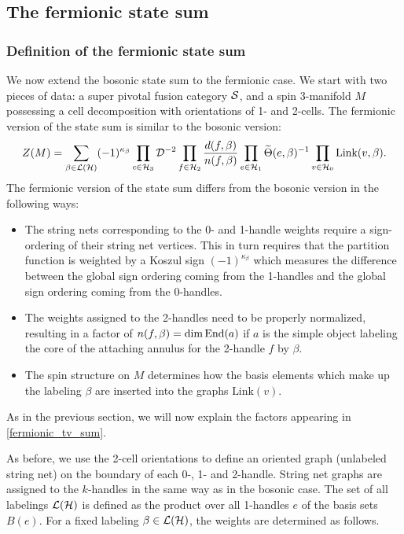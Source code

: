 \subsection{The fermionic state sum}


\subsubsection{Definition of the fermionic state sum}

We now extend the bosonic state sum to the fermionic case. 
We start with two pieces of data: a super pivotal fusion category $\mathcal{S}$, and a spin
3-manifold $M$ possessing a cell decomposition with orientations of 1- and 2-cells.
The fermionic version of the state sum is similar to the bosonic version:
\begin{align}
\label{fermionic_tv_sum}
	Z(M) = \sum_{\beta\in\mathcal{L}(\mathcal{H})}(-1)^{\kappa_\beta}
		\prod_{c\in\mathcal{H}_3} \mathcal{D}^{-2}
		\prod_{f\in\mathcal{H}_2} \frac{d(f, \beta)}{n(f,\beta)}
		\prod_{e\in\mathcal{H}_1}  \widetilde \Theta(e, \beta)^{-1}
		\prod_{v\in\mathcal{H}_0} \text{Link}(v, \beta) .
\end{align}
The fermionic version of the state sum differs from the bosonic version in the following ways:
\begin{itemize} 
\item 
The string nets corresponding to the 0- and 1-handle weights require a sign-ordering of their string net vertices. 
This in turn requires that the partition function is weighted by a Koszul sign $(-1)^{\kappa_\beta}$
which measures the difference between the global sign ordering coming from the 1-handles and the global sign ordering coming from the 0-handles.
\item The weights assigned to the 2-handles need to be properly normalized, 
resulting in a factor of $n(f,\beta) = \dim \text{End}(a)$ if $a$ is the simple object labeling the core of the attaching annulus for the 2-handle $f$ by $\beta$.
\item The spin structure on $M$ determines how the basis elements which make up the labeling $\beta$ are inserted into
the graphs $\text{Link}(v)$.
\end{itemize} 
As in the previous section, we will now explain 
the factors appearing in \eqref{fermionic_tv_sum}. 

As before, we use the 2-cell orientations to define an oriented graph (unlabeled string net) on the boundary of each 0-, 1- and 2-handle.
String net graphs are assigned to the $k$-handles in the same way as in the bosonic case. 
The set of all labelings $\mathcal{L}(\mathcal{H})$ is defined as the product over all 1-handles $e$ of the basis sets $B(e)$.
For a fixed labeling $\beta \in \mathcal{L}(\mathcal{H})$, the weights are determined as follows.

